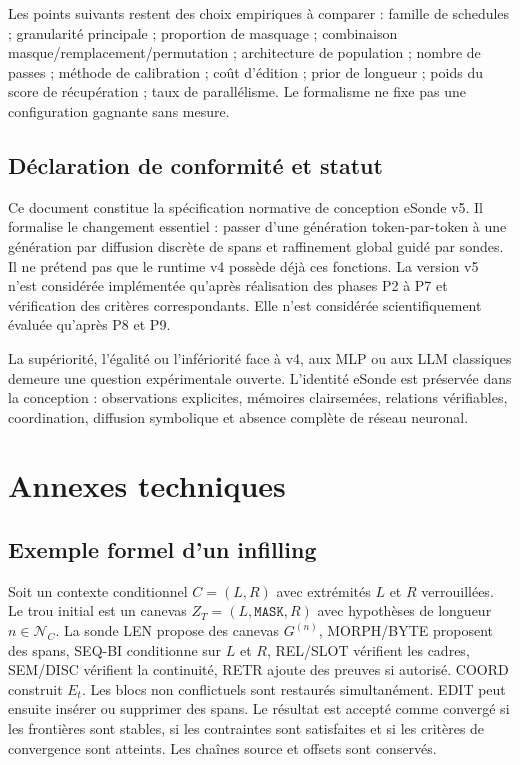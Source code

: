\documentclass[11pt,a4paper,oneside]{report}
\newcommand{\Mask}{\mathtt{MASK}}
\begin{document}
Les points suivants restent des choix empiriques à comparer : famille de schedules ; granularité principale ; proportion de masquage ; combinaison masque/remplacement/permutation ; architecture de population ; nombre de passes ; méthode de calibration ; coût d'édition ; prior de longueur ; poids du score de récupération ; taux de parallélisme. Le formalisme ne fixe pas une configuration gagnante sans mesure.

\chapter{Déclaration de conformité et statut}
Ce document constitue la spécification normative de conception eSonde v5. Il formalise le changement essentiel : passer d'une génération token-par-token à une génération par diffusion discrète de spans et raffinement global guidé par sondes. Il ne prétend pas que le runtime v4 possède déjà ces fonctions. La version v5 n'est considérée implémentée qu'après réalisation des phases P2 à P7 et vérification des critères correspondants. Elle n'est considérée scientifiquement évaluée qu'après P8 et P9.

La supériorité, l'égalité ou l'infériorité face à v4, aux MLP ou aux LLM classiques demeure une question expérimentale ouverte. L'identité eSonde est préservée dans la conception : observations explicites, mémoires clairsemées, relations vérifiables, coordination, diffusion symbolique et absence complète de réseau neuronal.

\appendix
\part{Annexes techniques}
\chapter{Exemple formel d'un infilling}
Soit un contexte conditionnel $C=(L,R)$ avec extrémités $L$ et $R$ verrouillées. Le trou initial est un canevas $Z_T=(L,\Mask, R)$ avec hypothèses de longueur $n\in\mathcal N_C$. La sonde LEN propose des canevas $G^{(n)}$, MORPH/BYTE proposent des spans, SEQ-BI conditionne sur $L$ et $R$, REL/SLOT vérifient les cadres, SEM/DISC vérifient la continuité, RETR ajoute des preuves si autorisé. COORD construit $E_t$. Les blocs non conflictuels sont restaurés simultanément. EDIT peut ensuite insérer ou supprimer des spans. Le résultat est accepté comme convergé si les frontières sont stables, si les contraintes sont satisfaites et si les critères de convergence sont atteints. Les chaînes source et offsets sont conservés.
\end{document}
